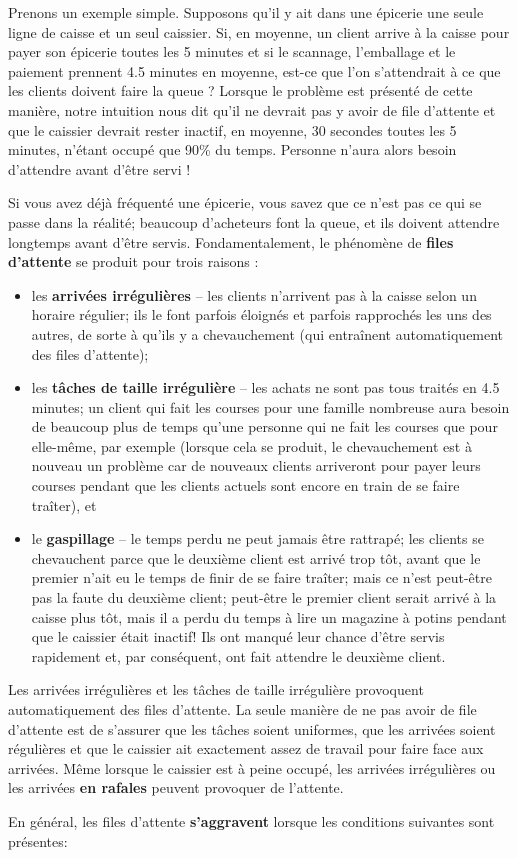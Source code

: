 \newl
Prenons un exemple simple. Supposons qu'il y ait dans une épicerie une seule ligne de caisse et un seul caissier. Si, en moyenne, un client arrive à la caisse pour payer son épicerie toutes les 5 minutes et si le scannage, l'emballage et le paiement prennent 4.5 minutes en moyenne, est-ce que l'on s'attendrait à ce que les clients doivent faire la queue ? Lorsque le problème est présenté de cette manière, notre intuition nous dit qu'il ne devrait pas y avoir de file d'attente et que le caissier devrait rester inactif, en moyenne, 30 secondes toutes les 5 minutes, n'étant occupé que 90\% du temps. Personne n'aura alors besoin d'attendre avant d'être servi ! \par Si vous avez déjà fréquenté une épicerie, vous savez que ce n'est pas ce qui se passe dans la réalité; beaucoup d'acheteurs font la queue, et ils doivent attendre longtemps avant d'être servis. 
 Fondamentalement, le phénomène de \textbf{files d'attente} se produit pour trois raisons :
  \begin{itemize}
 \item les \textbf{arrivées irrégulières} -- les clients n'arrivent pas à la caisse selon un horaire régulier; ils le font parfois éloignés et parfois rapprochés les uns des autres, de sorte à qu'ils y a chevauchement (qui entraînent automatiquement des files d'attente);
 \item les \textbf{tâches de taille irrégulière} -- les achats ne sont pas tous traités en 4.5 minutes; un client qui fait les courses pour une famille nombreuse aura besoin de beaucoup plus de temps qu'une personne qui ne fait les courses que pour elle-même, par exemple (lorsque cela se produit, le chevauchement est à nouveau un problème car de nouveaux clients  arriveront pour payer leurs courses pendant que les clients actuels sont encore en train de se faire traîter), et  
\item le \textbf{gaspillage} -- le temps perdu ne peut jamais être rattrapé; les clients se chevauchent parce que le deuxième client est arrivé trop tôt, avant que le premier n'ait eu le temps de finir de se faire traîter; mais ce n'est peut-être pas la faute du deuxième client; peut-être le premier client serait arrivé à la caisse plus tôt, mais il a perdu du temps à lire un magazine à potins pendant que le caissier était inactif! Ils ont manqué leur chance d'être servis rapidement et, par conséquent, ont fait attendre le deuxième client.
\end{itemize}
Les arrivées irrégulières et les t\^aches de taille irrégulière provoquent automatiquement des files d'attente. La seule manière de ne pas avoir de file d'attente est de s'assurer que les tâches soient uniformes, que les arrivées soient régulières et que le caissier ait exactement assez de travail pour faire face aux arrivées. Même lorsque le caissier est à peine occupé, les arrivées irrégulières ou les arrivées \textbf{en rafales} peuvent provoquer de l'attente. \par En général, les files d'attente \textbf{s'aggravent} lorsque les conditions suivantes sont présentes:
